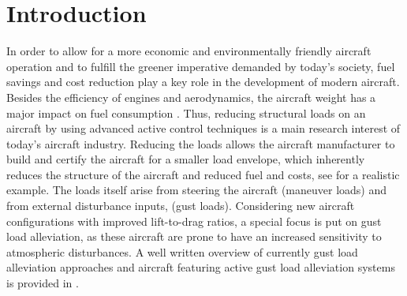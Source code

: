\documentclass[graybox]{svmult}
\begin{document}
\section{Introduction}

In order to allow for a more economic and environmentally friendly aircraft operation and to fulfill the greener imperative demanded by today's society, fuel savings and cost reduction play a key role in the development of modern aircraft. Besides the efficiency of engines and aerodynamics, the aircraft weight has a major impact on fuel consumption \cite{IEA2009}. 
Thus, reducing structural loads on an aircraft by using advanced active control techniques is a main research interest of today's aircraft industry. Reducing the loads allows the aircraft manufacturer to build and certify \cite{FAA15} the aircraft for a smaller load envelope, which inherently reduces the structure of the aircraft and reduced fuel and costs, see \cite{Johnston79} for a realistic example. The loads itself arise from steering the aircraft (maneuver loads) and from external disturbance inputs, (gust loads). Considering new aircraft configurations with improved lift-to-drag ratios, a special focus is put on gust load alleviation, as these aircraft are prone to have an increased sensitivity to atmospheric disturbances. A well written overview of currently gust load alleviation approaches and aircraft featuring  active gust load alleviation systems is provided in \cite{Regan12}.
\end{document}
